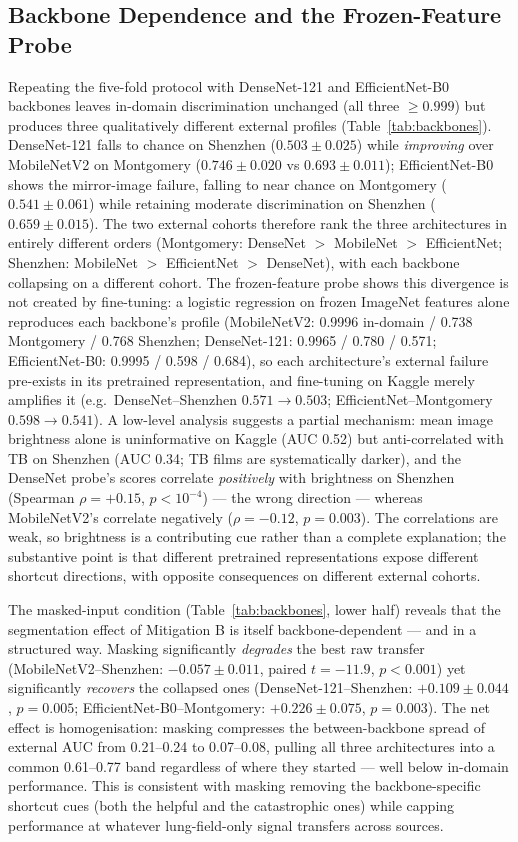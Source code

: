 \documentclass[journal]{IEEEtran}
\begin{document}
\subsection{Backbone Dependence and the Frozen-Feature Probe}
\label{sec:backbones}
Repeating the five-fold protocol with DenseNet-121 and EfficientNet-B0
backbones leaves in-domain discrimination unchanged (all three $\geq 0.999$)
but produces three qualitatively different external profiles
(Table~\ref{tab:backbones}). DenseNet-121 falls to chance on Shenzhen
($0.503 \pm 0.025$) while \emph{improving} over MobileNetV2 on Montgomery
($0.746 \pm 0.020$ vs $0.693 \pm 0.011$); EfficientNet-B0 shows the
mirror-image failure, falling to near chance on Montgomery
($0.541 \pm 0.061$) while retaining moderate discrimination on Shenzhen
($0.659 \pm 0.015$). The two external cohorts therefore rank the three
architectures in entirely different orders (Montgomery:
DenseNet $>$ MobileNet $>$ EfficientNet; Shenzhen:
MobileNet $>$ EfficientNet $>$ DenseNet), with each backbone collapsing on a
different cohort. The frozen-feature probe shows this divergence is not created
by fine-tuning: a logistic regression on frozen ImageNet features alone
reproduces each backbone's profile (MobileNetV2: 0.9996 in-domain / 0.738
Montgomery / 0.768 Shenzhen; DenseNet-121: 0.9965 / 0.780 / 0.571;
EfficientNet-B0: 0.9995 / 0.598 / 0.684), so each architecture's external
failure pre-exists in its pretrained representation, and fine-tuning on Kaggle
merely amplifies it (e.g.\ DenseNet--Shenzhen $0.571 \rightarrow 0.503$;
EfficientNet--Montgomery $0.598 \rightarrow 0.541$). A low-level analysis
suggests a partial mechanism: mean image brightness alone is uninformative on
Kaggle (AUC 0.52) but anti-correlated with TB on Shenzhen (AUC 0.34; TB films
are systematically darker), and the DenseNet probe's scores correlate
\emph{positively} with brightness on Shenzhen (Spearman $\rho = +0.15$,
$p < 10^{-4}$) --- the wrong direction --- whereas MobileNetV2's correlate
negatively ($\rho = -0.12$, $p = 0.003$). The correlations are weak, so
brightness is a contributing cue rather than a complete explanation; the
substantive point is that different pretrained representations expose different
shortcut directions, with opposite consequences on different external cohorts.

The masked-input condition (Table~\ref{tab:backbones}, lower half) reveals that
the segmentation effect of Mitigation B is itself backbone-dependent --- and in
a structured way. Masking significantly \emph{degrades} the best raw transfer
(MobileNetV2--Shenzhen: $-0.057 \pm 0.011$, paired $t = -11.9$, $p < 0.001$)
yet significantly \emph{recovers} the collapsed ones
(DenseNet-121--Shenzhen: $+0.109 \pm 0.044$, $p = 0.005$;
EfficientNet-B0--Montgomery: $+0.226 \pm 0.075$, $p = 0.003$). The net effect
is homogenisation: masking compresses the between-backbone spread of external
AUC from 0.21--0.24 to 0.07--0.08, pulling all three architectures into a
common 0.61--0.77 band regardless of where they started --- well below
in-domain performance. This is consistent with masking removing the
backbone-specific shortcut cues (both the helpful and the catastrophic ones)
while capping performance at whatever lung-field-only signal transfers across
sources.
\end{document}
